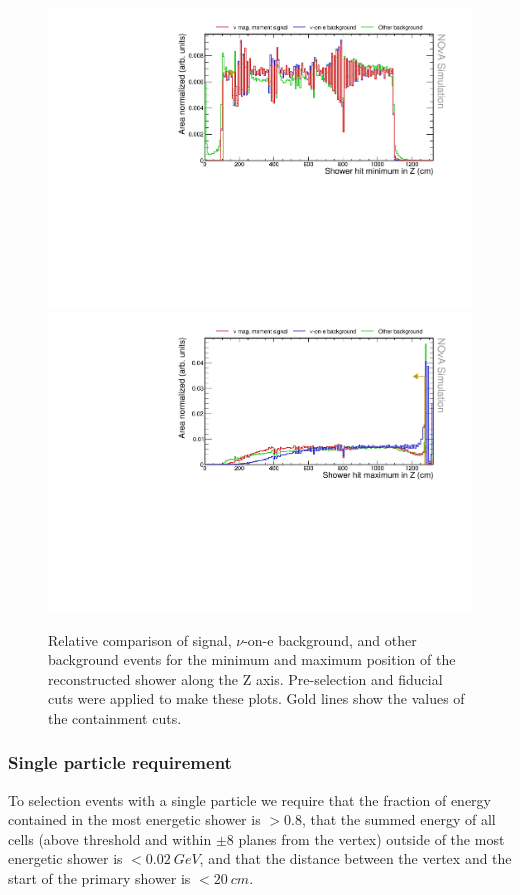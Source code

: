 \begin{figure}[hbtp]
\centering
\includegraphics[width=.9\textwidth]{Plots/NuMMEventSelection/N1Cut_minZ.pdf}
\includegraphics[width=.9\textwidth]{Plots/NuMMEventSelection/N1Cut_maxZ.pdf}
\caption{Relative comparison of signal, $\nu$-on-e background, and other background events for the minimum and maximum position of the reconstructed shower along the Z axis. Pre-selection and fiducial cuts were applied to make these plots. Gold lines show the values of the containment cuts.}
\label{fig:ContainmentCutsZ}
\end{figure}

\subsubsection*{Single particle requirement}

To selection events with a single particle we require that the fraction of energy contained in the most energetic shower is $>0.8$, that the summed energy of all cells (above threshold and within $\pm8$ planes from the vertex) outside of the most energetic shower is $<0.02\ \unit{GeV}$, and that the distance between the vertex and the start of the primary shower is $<20\ \unit{cm}$.

